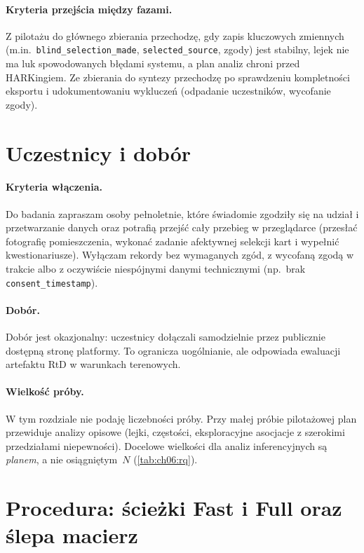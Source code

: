 \paragraph{Kryteria przejścia między fazami.}
Z pilotażu do głównego zbierania przechodzę, gdy zapis kluczowych zmiennych (m.in.\ \texttt{blind\_selection\_made}, \texttt{selected\_source}, zgody) jest stabilny, lejek nie ma luk spowodowanych błędami systemu, a plan analiz chroni przed HARKingiem. Ze zbierania do syntezy przechodzę po sprawdzeniu kompletności eksportu i udokumentowaniu wykluczeń (odpadanie uczestników, wycofanie zgody).

\section{Uczestnicy i dobór}
\label{ch06:sec:uczestnicy}

\paragraph{Kryteria włączenia.}
Do badania zapraszam osoby pełnoletnie, które świadomie zgodziły się na udział i przetwarzanie danych oraz potrafią przejść cały przebieg w przeglądarce (przesłać fotografię pomieszczenia, wykonać zadanie afektywnej selekcji kart i wypełnić kwestionariusze). Wyłączam rekordy bez wymaganych zgód, z wycofaną zgodą w trakcie albo z oczywiście niespójnymi danymi technicznymi (np.\ brak \texttt{consent\_timestamp}).

\paragraph{Dobór.}
Dobór jest okazjonalny: uczestnicy dołączali samodzielnie przez publicznie dostępną stronę platformy. To ogranicza uogólnianie, ale odpowiada ewaluacji artefaktu RtD w warunkach terenowych.

\paragraph{Wielkość próby.}
W tym rozdziale nie podaję liczebności próby. Przy małej próbie pilotażowej plan przewiduje analizy opisowe (lejki, częstości, eksploracyjne asocjacje z szerokimi przedziałami niepewności). Docelowe wielkości dla analiz inferencyjnych są \emph{planem}, a nie osiągniętym~$N$ (\cref{tab:ch06:rq}).

\section{Procedura: ścieżki Fast i Full oraz ślepa macierz}
\label{ch06:sec:procedura}


